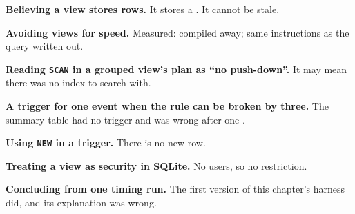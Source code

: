 \begin{pitfall}
\begin{tight}
  \item \textbf{Believing a view stores rows.} It stores a . It
        cannot be stale.
  \item \textbf{Avoiding views for speed.} Measured: compiled away; same
        instructions as the query written out.
  \item \textbf{Reading \texttt{SCAN} in a grouped view's plan as ``no
        push-down''.} It may mean there was no index to search with.
  \item \textbf{A trigger for one event when the rule can be broken by three.}
        The summary table had no  trigger and was wrong after one
        .
  \item \textbf{Using \texttt{NEW} in a  trigger.} There is no
        new row.
  \item \textbf{Treating a view as security in SQLite.} No users, so no
        restriction.
  \item \textbf{Concluding from one timing run.} The first version of this
        chapter's harness did, and its explanation was wrong.
\end{tight}
\end{pitfall}

